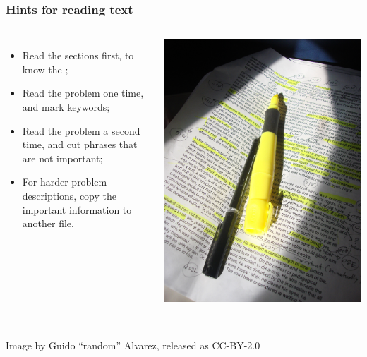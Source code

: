 \documentclass{beamer}
\begin{document}
\begin{frame}
  \frametitle{Hints for reading text}
  
  \begin{columns}
    \begin{itemize}
    \item Read the  sections first, to know
      the ;
    \item Read the problem one time, and mark keywords;
    \item Read the problem a second time, and cut phrases that are not
      important;
    \item For harder problem descriptions, copy the important
      information to another file.
    \end{itemize}
    \includegraphics[width=\textwidth]{../img/textmarker}
  \end{columns}

  \vfill

  \hrulefill\\
  \hfill {\tiny Image by Guido ``random'' Alvarez, released as CC-BY-2.0}

\end{frame}
\end{document}

